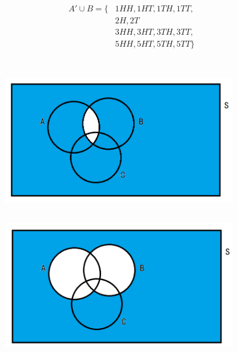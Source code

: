 \documentclass{article}
\begin{document}
            \paragraph{
                \begin{equation*}
                    \begin{split}
                        A'\cup B =\{&1HH,1HT,1TH,1TT,\\
                            &2H,2T\\
                            &3HH,3HT,3TH,3TT,\\
                            &5HH,5HT,5TH,5TT\}\\
                    \end{split}
                \end{equation*}
            }
    \section{}
        \subsection{}
            \begin{figure}[H]
                \centering
                \includegraphics[width=0.9\textwidth]{img/Assignment1-01.png}
            \end{figure}
        \subsection{}
            \begin{figure}[H]
                \centering
                \includegraphics[width=0.9\textwidth]{img/Assignment1-02.png}
            \end{figure}
\end{document}

